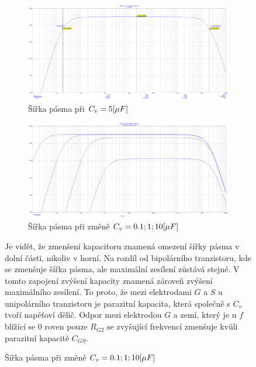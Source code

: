 \documentclass{article}
\begin{document}
\begin{figure}[H]
	\begin{minipage}[t]{1\textwidth}
    \begin{figure}[H]
      \includegraphics[width=\textwidth]{PC/UNI/UNI_sirka_pasma_2.png}
      \caption{\label{sirka_pasma} Šířka pásma při \(C_v = 5\-[\mu F]\)}
    \end{figure}
    \begin{figure}[H]
      \includegraphics[width=\textwidth]{PC/UNI/UNI_sirky_pasma.png}
      \caption{\label{Pohyb_sirky_pasma} Šířka pásma při změně \(C_v = 0.1;1;10\-[\mu F]\)}
    \end{figure}
  \end{minipage}

  \begin{minipage}[t]{1\textwidth}
    \vspace{5mm}
    Je vidět, že zmenšení kapacitoru znamená omezení šířky pásma v dolní části, nikoliv v horní.
    Na rozdíl od bipolárního tranzistoru, kde se zmenšuje šířka pásma, ale maximální zesílení zůstává stejné.
    V tomto zapojení zvýšení kapacity znamená zároveň zvýšení maximálního zesílení.
    To proto, že mezi elektrodami \(G\) a \(S\) u unipolárního tranzistoru je parazitní kapacita, která společně s \(C_v\) tvoří napěťoví dělič.
    Odpor mezi elektrodou \(G\) a zemí, který je u \(f\) blížící se \(0\) roven pouze \(R_{G2}\) se zvyšující frekvencí zmenšuje kvůli parazitní kapacitě \(C_{GS}\).
  \end{minipage}
\end{figure}
\end{document}

